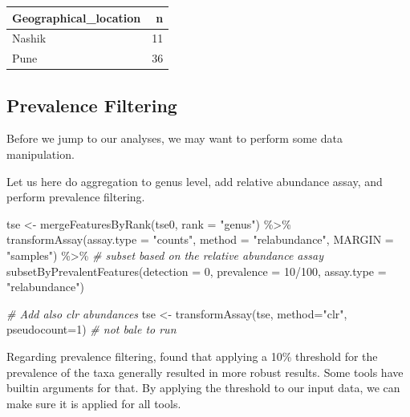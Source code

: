 \documentclass[
]{book}
\newenvironment{Shaded}{\begin{snugshade}}{\end{snugshade}}
\newcommand{\AttributeTok}[1]{\textcolor[rgb]{0.77,0.63,0.00}{#1}}
\newcommand{\CommentTok}[1]{\textcolor[rgb]{0.56,0.35,0.01}{\textit{#1}}}
\newcommand{\DecValTok}[1]{\textcolor[rgb]{0.00,0.00,0.81}{#1}}
\newcommand{\FunctionTok}[1]{\textcolor[rgb]{0.00,0.00,0.00}{#1}}
\newcommand{\NormalTok}[1]{#1}
\newcommand{\OtherTok}[1]{\textcolor[rgb]{0.56,0.35,0.01}{#1}}
\newcommand{\SpecialCharTok}[1]{\textcolor[rgb]{0.00,0.00,0.00}{#1}}
\newcommand{\StringTok}[1]{\textcolor[rgb]{0.31,0.60,0.02}{#1}}
\begin{document}
\begin{tabular}{l|r}
\hline
Geographical\_location & n\\
\hline
Nashik & 11\\
\hline
Pune & 36\\
\hline
\end{tabular}

\hypertarget{prevalence-filtering}{%
\subsection{Prevalence Filtering}\label{prevalence-filtering}}

Before we jump to our analyses, we may want to perform some data
manipulation.

Let us here do aggregation to genus level, add relative abundance
assay, and perform prevalence filtering.

\begin{Shaded}
\begin{Highlighting}[]
\NormalTok{tse }\OtherTok{\textless{}{-}} \FunctionTok{mergeFeaturesByRank}\NormalTok{(tse0, }\AttributeTok{rank =} \StringTok{"genus"}\NormalTok{) }\SpecialCharTok{\%\textgreater{}\%}
       \FunctionTok{transformAssay}\NormalTok{(}\AttributeTok{assay.type =} \StringTok{"counts"}\NormalTok{,}
                       \AttributeTok{method =} \StringTok{"relabundance"}\NormalTok{,}
               \AttributeTok{MARGIN =} \StringTok{"samples"}\NormalTok{) }\SpecialCharTok{\%\textgreater{}\%}
       \CommentTok{\# subset based on the relative abundance assay              }
       \FunctionTok{subsetByPrevalentFeatures}\NormalTok{(}\AttributeTok{detection =} \DecValTok{0}\NormalTok{,}
                             \AttributeTok{prevalence =} \DecValTok{10}\SpecialCharTok{/}\DecValTok{100}\NormalTok{,}
                 \AttributeTok{assay.type =} \StringTok{"relabundance"}\NormalTok{)}

\CommentTok{\# Add also clr abundances}
\NormalTok{tse }\OtherTok{\textless{}{-}} \FunctionTok{transformAssay}\NormalTok{(tse, }\AttributeTok{method=}\StringTok{"clr"}\NormalTok{, }\AttributeTok{pseudocount=}\DecValTok{1}\NormalTok{) }\CommentTok{\# not bale to run}
\end{Highlighting}
\end{Shaded}

Regarding prevalence filtering, \citet{Nearing2022} found that applying a 10\%
threshold for the prevalence of the taxa generally resulted in more
robust results. Some tools have builtin arguments for that. By
applying the threshold to our input data, we can make sure it is
applied for all tools.
\end{document}

